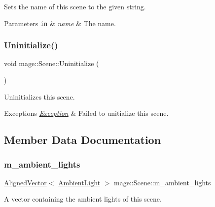 Sets the name of this scene to the given string.


\begin{DoxyParams}[1]{Parameters}
\mbox{\tt in}  & {\em name} & The name. \\
\hline
\end{DoxyParams}
\hypertarget{classmage_1_1_scene_a714dc33c04dc2b8e2cec93564905b174}{}\label{classmage_1_1_scene_a714dc33c04dc2b8e2cec93564905b174} 
\subsubsection{\texorpdfstring{Uninitialize()}{Uninitialize()}}
{\footnotesize\ttfamily void mage\+::\+Scene\+::\+Uninitialize (\begin{DoxyParamCaption}{ }\end{DoxyParamCaption})}

Uninitializes this scene.


\begin{DoxyExceptions}{Exceptions}
{\em \hyperlink{classmage_1_1_exception}{Exception}} & Failed to unitialize this scene. \\
\hline
\end{DoxyExceptions}


\subsection{Member Data Documentation}
\hypertarget{classmage_1_1_scene_a23e6a98049fa7a4cc26b6d5521247d1a}{}\label{classmage_1_1_scene_a23e6a98049fa7a4cc26b6d5521247d1a} 
\subsubsection{\texorpdfstring{m\+\_\+ambient\+\_\+lights}{m\_ambient\_lights}}
{\footnotesize\ttfamily \hyperlink{namespacemage_a8664bfb5ce2179fc64eae9f82c8a5ba8}{Aligned\+Vector}$<$ \hyperlink{classmage_1_1_ambient_light}{Ambient\+Light} $>$ mage\+::\+Scene\+::m\+\_\+ambient\+\_\+lights\hspace{0.3cm}{\ttfamily [private]}}

A vector containing the ambient lights of this scene. \hypertarget{classmage_1_1_scene_a10f42f0384140b36ffdf3db1adbe2120}{}\label{classmage_1_1_scene_a10f42f0384140b36ffdf3db1adbe2120} 
